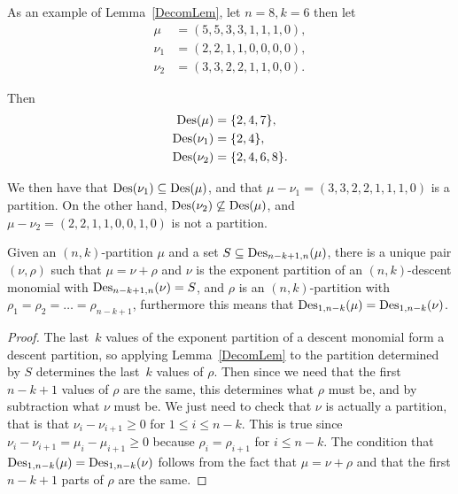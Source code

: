 \documentclass[10pt]{article}
\begin{document}
\begin{exam}
As an example of Lemma~\ref{DecomLem}, let $n=8,k=6$ then let 
\begin{align}
\mu&=(5,5,3,3,1,1,1,0),\\ 
\nu_1&=(2,2,1,1,0,0,0,0),\\\nu_2&=(3,3,2,2,1,1,0,0).
\end{align}

Then \begin{align}\operatorname{Des} (\mu)&=\{2,4,7\},\\\operatorname{Des} (\nu_1)&=\{2,4\},\\\operatorname{Des} (\nu_2)&=\{2,4,6,8\}.\end{align}

We then have that $\operatorname{Des} (\nu_1)\subseteq \operatorname{Des} (\mu)$, and that $\mu-\nu_1=(3,3,2,2,1,1,1,0)$ is a partition. On the other hand, 
$\operatorname{Des} (\nu_2)\not\subseteq \operatorname{Des} (\mu)$, and $\mu-\nu_2=(2,2,1,1,0,0,1,0)$ is not a partition.


\end{exam}


\begin{lemm}

\label{Decom2Lem}

Given an $(n,k)$-partition $\mu$ and a set $S\subseteq \operatorname{Des} _{n-k+1,n}(\mu)$, there is a unique pair $(\nu,\rho)$ such that 
$\mu=\nu+\rho$ and $\nu$ is the exponent partition of an $(n,k)$-descent monomial with $\operatorname{Des} _{n-k+1,n}(\nu)=S$, and $\rho$ is an 
$(n,k)$-partition with $\rho_1=\rho_2=\ldots =\rho_{n-k+1}$, furthermore this means that $\operatorname{Des} _{1,n-k}(\mu)=\operatorname{Des} _{1,n-k}(\nu)$.

	\begin{proof}

		The last~$k$ values of the exponent partition of a descent monomial form a descent partition, so applying Lemma~\ref{DecomLem} to the partition determined by $S$ determines the last~$k$ values of $\rho$. Then since we need 
that the first $n-k+1$ values of $\rho$ are the same, this determines what $\rho$ must be, and by subtraction what 
$\nu$ must be. We just need to check that $\nu$ is actually a partition, that is that $\nu_i-\nu_{i+1}\geq 0$ for 
$1\leq i\leq n-k$. This is true since $\nu_i-\nu_{i+1}=\mu_{i}-\mu_{i+1}\geq 0$ because $\rho_i=\rho_{i+1}$ for $i\leq 
n-k$. The condition that $\operatorname{Des} _{1,n-k}(\mu)=\operatorname{Des} _{1,n-k}(\nu)$ follows from the fact that $\mu=\nu+\rho$ and that the 
first $n-k+1$ parts of $\rho$ are the same. 
	\end{proof}

\end{lemm}
\end{document}
